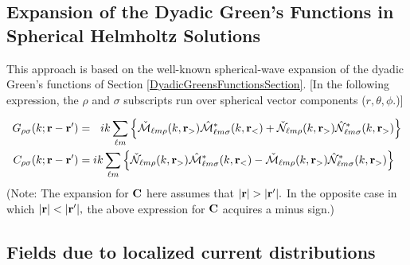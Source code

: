 \documentclass[letterpaper]{article}
\begin{document}
\subsection*{Expansion of the Dyadic Green's Functions in Spherical Helmholtz Solutions}

This approach is based on the well-known spherical-wave expansion 
of the dyadic Green's functions of Section \ref{DyadicGreensFunctionsSection}.
[In the following expression, the $\rho$ and $\sigma$ subscripts run over
spherical vector components ($r,\theta,\phi$.)]

\begin{subequations}
\begin{align}
  G_{\rho\sigma} (k; \mathbf{r}-\mathbf{r}^\prime)
&=\hspace{0.09in} ik
  \sum_{\ell m} 
  \Big\{ 
     \check{\mathcal{M}}_{\ell m \rho}( k, \mathbf{r}_>)
     \hat{\mathcal{M}}^*_{\ell m \sigma}( k, \mathbf{r}_<) 
   + \check{\mathcal{N}}_{\ell m \rho}( k, \mathbf{r}_>)
     \hat{\mathcal{N}}^*_{\ell m \sigma}( k, \mathbf{r}_>) 
  \Big\}
\\
  C_{\rho\sigma} (k; \mathbf{r}-\mathbf{r}^\prime)
&=ik
  \sum_{\ell m} 
  \Big\{ 
     \check{\mathcal{N}}_{\ell m \rho}( k, \mathbf{r}_>)
     \hat{\mathcal{M}}^*_{\ell m \sigma}( k, \mathbf{r}_<) 
   - \check{\mathcal{M}}_{\ell m \rho}( k, \mathbf{r}_>)
     \hat{\mathcal{N}}^*_{\ell m \sigma}( k, \mathbf{r}_>) 
  \Big\}
\end{align}
\label{GCExpansions}
\end{subequations}
(Note: The expansion for $\mathbf{C}$ here assumes that 
$|\vb r|>|\vb r^\prime|.$ In the opposite case in 
which 
$|\vb r|<|\vb r^\prime|,$ the above expression for $\mathbf{C}$
acquires a minus sign.)

\subsection*{Fields due to localized current distributions}
\end{document}
